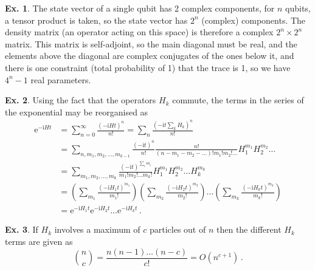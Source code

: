 \documentclass[a4paper,12pt]{article}
\def\e{\mathrm{e}}
\def\imagi{\mathrm{i}}
\theoremstyle{definition}
\newtheorem{exercise}{Ex.}[section]
\begin{document}
\begin{exercise}
 The state vector of a single qubit has 2 complex components, for $n$ qubits, a tensor product is taken, so the state vector has $2^n$ (complex) components. The density matrix (an operator acting on this space) is therefore a complex $2^n\times 2^n$ matrix. This matrix is self-adjoint, so the main diagonal must be real, and the elements above the diagonal are complex conjugates of the ones below it, and there is one constraint (total probability of 1) that the trace is 1, so we have $4^n-1$ real parameters.
\end{exercise}

\begin{exercise} Using the fact that the operators $H_k$ commute, the terms in the series of the exponential may be reorganised as
 \[
  \begin{aligned}
  \e^{-\imagi H t} &= \sum_{n=0}^\infty \frac{(-\imagi H t)^n}{n!} = \sum_n \frac{(-\imagi t\sum_k H_k)^n}{n!}\\ &= \sum_{n, m_1, m_2,\dots,m_{k-1}} \frac{(-\imagi t)^n}{n!}\frac{n!}{(n-m_1-m_2-\dots)! m_1! m_2!\dots}H_1^{m_1}H_2^{m_2}\dots \\
  &= \sum_{m_1, m_2,\dots,m_k} \frac{(-\imagi t)^{\sum_i m_i}}{m_1! m_2!\dots m_k!}H_1^{m_1}H_2^{m_2}\dots H_k^{m_k}\\
  &= \left(\sum_{m_1}\frac{(-\imagi H_1 t)^{m_1}}{m_1!}\right)
  \left(\sum_{m_2}\frac{(-\imagi H_2 t)^{m_2}}{m_2!}\right)\dots
  \left(\sum_{m_k}\frac{(-\imagi H_k t)^{m_k}}{m_k!}\right) \\
  &= \e^{-\imagi H_1 t}\e^{-\imagi H_2 t}\dots \e^{-\imagi H_k t}\,.
 \end{aligned}
 \]
\end{exercise}

\begin{exercise}
 If $H_k$ involves a maximum of $c$ particles out of $n$ then the different $H_k$ terms are given as
 \[
  \binom{n}{c} = \frac{n(n-1)\dots (n-c)}{c!} = O(n^{c+1})\,.
 \]
\end{exercise}
\end{document}
